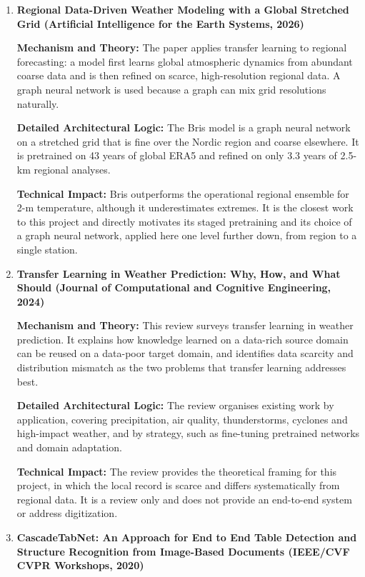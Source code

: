 \begin{enumerate}
\item \textbf{Regional Data-Driven Weather Modeling with a Global Stretched Grid (Artificial Intelligence for the Earth Systems, 2026)}

\textbf{Mechanism and Theory:} The paper applies transfer learning to regional forecasting: a model first learns global atmospheric dynamics from abundant coarse data and is then refined on scarce, high-resolution regional data. A graph neural network is used because a graph can mix grid resolutions naturally.

\textbf{Detailed Architectural Logic:} The Bris model is a graph neural network on a stretched grid that is fine over the Nordic region and coarse elsewhere. It is pretrained on 43 years of global ERA5 and refined on only 3.3 years of 2.5-km regional analyses.

\textbf{Technical Impact:} Bris outperforms the operational regional ensemble for 2-m temperature, although it underestimates extremes. It is the closest work to this project and directly motivates its staged pretraining and its choice of a graph neural network, applied here one level further down, from region to a single station.

\item \textbf{Transfer Learning in Weather Prediction: Why, How, and What Should (Journal of Computational and Cognitive Engineering, 2024)}

\textbf{Mechanism and Theory:} This review surveys transfer learning in weather prediction. It explains how knowledge learned on a data-rich source domain can be reused on a data-poor target domain, and identifies data scarcity and distribution mismatch as the two problems that transfer learning addresses best.

\textbf{Detailed Architectural Logic:} The review organises existing work by application, covering precipitation, air quality, thunderstorms, cyclones and high-impact weather, and by strategy, such as fine-tuning pretrained networks and domain adaptation.

\textbf{Technical Impact:} The review provides the theoretical framing for this project, in which the local record is scarce and differs systematically from regional data. It is a review only and does not provide an end-to-end system or address digitization.

\item \textbf{CascadeTabNet: An Approach for End to End Table Detection and Structure Recognition from Image-Based Documents (IEEE/CVF CVPR Workshops, 2020)}


\end{enumerate}
